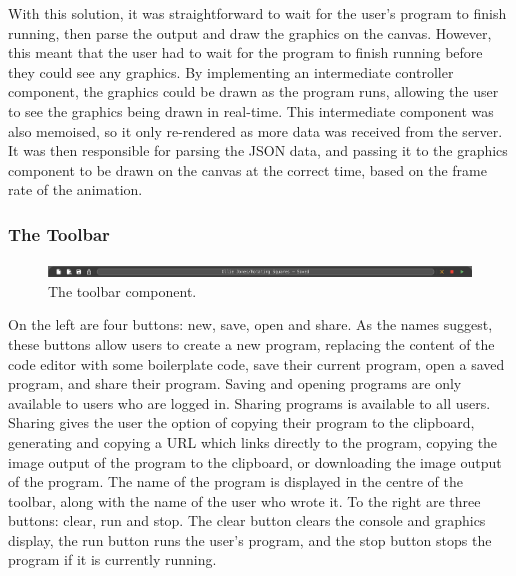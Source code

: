 \documentclass[../main.tex]{subfiles}
\begin{document}
                With this solution, it was straightforward to wait for the user's program to
                    finish running, then parse the output and draw the graphics on the canvas.
                However, this meant that the user had to wait for the program to finish running
                    before they could see any graphics.
                By implementing an intermediate controller component, the graphics could be
                    drawn as the program runs, allowing the user to see the graphics being drawn in
                    real-time.
                This intermediate component was also memoised, so it only re-rendered as more
                    data was received from the server.
                It was then responsible for parsing the JSON data, and passing it to the
                    graphics component to be drawn on the canvas at the correct time, based on the
                    frame rate of the animation.

            \subsubsection{The Toolbar}
                \begin{figure}[H]
                    \centering
                    \includegraphics[width=\linewidth]{images/toolbar.png}
                        \caption{The toolbar component.}
                        \label{fig:toolbar}
                \end{figure}

                On the left are four buttons: new, save, open and share.
                As the names suggest, these buttons allow users to create a new program,
                    replacing the content of the code editor with some boilerplate code, save their
                    current program, open a saved program, and share their program.
                Saving and opening programs are only available to users who are logged in.
                Sharing programs is available to all users.
                Sharing gives the user the option of copying their program to the clipboard,
                    generating and copying a URL which links directly to the program, copying the
                    image output of the program to the clipboard, or downloading the image output
                    of the program.
                The name of the program is displayed in the centre of the toolbar, along with
                    the name of the user who wrote it.
                To the right are three buttons: clear, run and stop.
                The clear button clears the console and graphics display, the run button runs
                    the user's program, and the stop button stops the program if it is currently
                    running.
\end{document}

